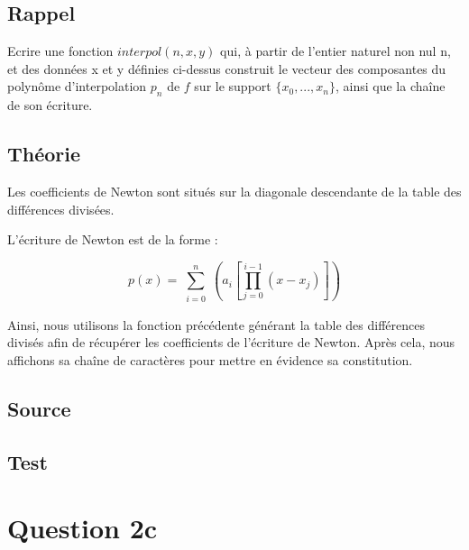 \documentclass[a4paper,10pt]{report}
\begin{document}
\subsection*{Rappel}

Ecrire une fonction $interpol(n, x, y)$ qui, à partir de l’entier naturel non
nul n, et des données x et y définies ci-dessus construit le vecteur des
composantes du polynôme d’interpolation $p_{n}$ de $f$ sur le support $\lbrace  x_{0},...,x_{n} \rbrace$,
ainsi que la chaîne de son écriture.

\subsection*{Théorie}

Les coefficients de Newton sont situés sur la diagonale descendante de la table des différences divisées. 

L’écriture de Newton est de la forme :

\begin{equation}
p(x) = \sum_{\substack{i=0}}^{n} \left(a_{i}\left[\prod_{j=0}^{i-1}(x-x_{j})\right]\right)
\end{equation}

Ainsi, nous utilisons la fonction précédente générant la table des différences divisés afin de récupérer les coefficients de l’écriture de Newton. Après cela, nous affichons sa chaîne de caractères pour mettre en évidence sa constitution. 

\newpage
\subsection*{Source}

\begin{center}
	
\end{center}

\subsection*{Test}

\begin{center}
	
\end{center}

\section*{Question 2c}
\end{document}
